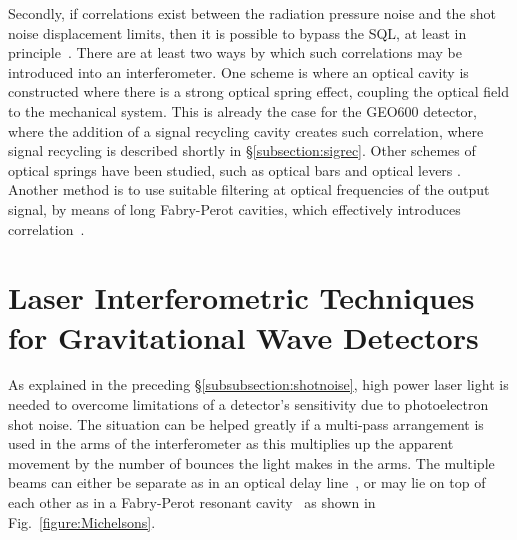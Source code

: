\documentclass{article}
\begin{document}
Secondly, if correlations exist between the radiation pressure noise and the
shot noise displacement limits, then it is possible to bypass the SQL, at least
in principle~\cite{Unruh:1982}.  There are at least two ways by which such
correlations may be introduced into an interferometer.  One scheme is where an
optical cavity is constructed where there is a strong optical spring effect,
coupling the optical field to the mechanical system.  This is already the case
for the GEO600 detector, where the addition of a signal recycling cavity creates
such correlation, where signal recycling is described shortly in
\S\ref{subsection:sigrec}. Other schemes of optical springs have been studied,
such as optical bars and optical levers \cite{Braginsky:1996, Braginsky:1997}.
Another method is to use suitable filtering at optical frequencies of the
output signal, by means of long Fabry-Perot cavities, which effectively
introduces correlation~\cite{Kimble:2001, Corbitt:2004}.


\newpage

\section{Laser Interferometric Techniques for Gravitational Wave Detectors}
\label{section:interferometry}

As explained in the preceding \S\ref{subsubsection:shotnoise}, high power laser
light is needed to overcome limitations of a detector's sensitivity due to
photoelectron shot noise. The situation can be helped greatly if a multi-pass
arrangement is used in the arms of the interferometer as this multiplies up the
apparent movement by the number of bounces the light makes in the arms. The
multiple beams can either be separate as in an optical delay line~\cite{Weiss,
Billing}, or may lie on top of each other as in a Fabry-Perot resonant
cavity~\cite{Drever2} as shown in Fig.~\ref{figure:Michelsons}.

\end{document}
